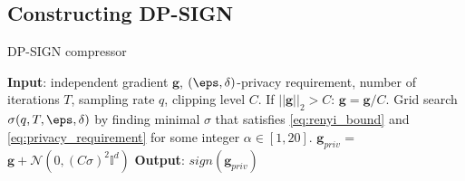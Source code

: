 \subsection{Constructing DP-SIGN}
\newcommand{\gradg}{\boldsymbol{g}}
\begin{algorithm}
    \caption{DP-SIGN compressor}
    \label{dp-sign-precise}
    \begin{algorithmic}
        \STATE \textbf{Input}: independent gradient $\boldsymbol{g}$, $(\eps, \delta)$-privacy requirement, number of iterations $T$, sampling rate $q$, clipping level $C$.
        \STATE If $||\gradg||_2 > C$: $\gradg = \gradg / C$.
        \STATE Grid search $\sigma(q, T, \eps, \delta)$ by finding minimal $\sigma$ that satisfies \eqref{eq:renyi_bound} and \eqref{eq:privacy_requirement} for some integer $\alpha \in [1,20]$.
        \STATE $\gradg_{priv}$ = $\gradg + \mathcal{N}(0,(C\sigma)^2\mathbb{I}^d)$
        \STATE \textbf{Output}: $sign(\gradg_{priv})$
    \end{algorithmic}
\end{algorithm} 